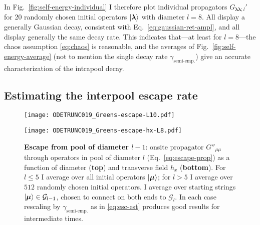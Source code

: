 \documentclass[aps,prb,nofootinbib,twocolumn,balancelastpage,amsmath,amssymb,floatfix,superscriptaddress,]{revtex4-1}
\newcommand{\todo}[1]{{\color{red}\footnotesize \textsc{todo} \textsf{\textsl{#1}}}}
\newcommand{\tr}{\operatorname{Tr}}
\newcommand{\graph}{\mathrm{graph}}
\newcommand{\pool}{\mathcal G}
\newcommand{\semiemp}{\text{semi-emp.}}
\begin{document}
{In Fig.~\ref{fig:self-energy-individual}
I therefore plot individual propagators $G_{\bm\lambda\bm\lambda;l}'$
for 20 randomly chosen initial operators $\ket{\bm \lambda}$ with diameter $l = 8$.
All display a generally Gaussian decay, consistent with Eq.~\eqref{eq:gaussian-ret-ampl},
and all display generally the same decay rate.
This indicates that---at least for $l=8$---the chaos assumption \eqref{eq:chaos} is reasonable,
and the averages of Fig.~\ref{fig:self-energy-average}
(not to mention the single decay rate $\gamma_\semiemp$)
give an accurate characterization of the intrapool decay.



\subsection{Estimating the interpool escape rate}

\begin{figure}
  \begin{minipage}{0.45\textwidth}
    \texttt{[image: ODETRUNC019\_Greens-escape-L10.pdf]}
  \end{minipage}

  \begin{minipage}{0.45\textwidth}
    \texttt{[image: ODETRUNC019\_Greens-escape-hx-L8.pdf]}
  \end{minipage}
  \caption{\textbf{Escape from pool of diameter $l-1$}:
    onsite propagator $G''_{\mu\mu}$ through operators in pool of diameter $l$ (Eq.~\eqref{eq:escape-prop})
    as a function of diameter (\textbf{top}) and transverse field $h_x$ (\textbf{bottom}).
    For $l \le 5$ I average over all initial operators $\ket{\bm \mu}$;
    for $l > 5$ I average over $512$ randomly chosen initial operators. 
    I average over starting strings $\ket {\bm \mu} \in \pool_{l-1}$,
    chosen to connect on both ends to $\pool_{l}$.
    In each case rescaling by $\gamma_\semiemp$ as in \eqref{eq:esc-est} produces good results for intermediate times.
  }
  \label{fig:escape}
\end{figure}

}
\end{document}
